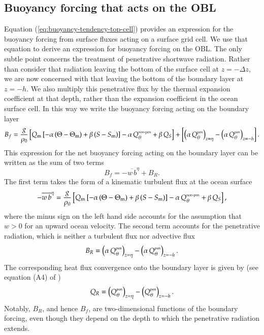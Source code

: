 \subsection{Buoyancy forcing that acts on the OBL}
\label{subsection:buoyancy-forcing-obl}

Equation (\ref{eq:buoyancy-tendency-top-cell}) provides an expression
for the buoyancy forcing from surface fluxes acting on a surface grid
cell.  We use that equation to derive an expression for buoyancy
forcing on the OBL.  The only subtle point concerns the treatment of
penetrative shortwave radiation.  Rather than consider that radiation
leaving the bottom of the surface cell at $z=-\Delta z$, we are now
concerned with that leaving the bottom of the boundary layer at
$z=-h$.  We also multiply this penetrative flux by the thermal
expansion coefficient at that depth, rather than the expansion
coefficient in the ocean surface cell.  In this way we write the
buoyancy forcing acting on the boundary layer
\begin{equation}
B_{f} =  \frac{g}{\rho_{0}} 
  \left[ 
 Q_{\mbox{\scriptsize m}} \, [ -\alpha \, (\Theta - \Theta_{\mbox{\scriptsize m}}) +  \beta \, (S - S_{\mbox{\scriptsize m}}) ]
  -\alpha \,  Q_{\theta}^{\mbox{\tiny non-pen}} + \beta \, Q_{S} 
  \right]
+ \left[ 
    \left( \alpha \, Q_{\theta}^{\mbox{\tiny pen}} \right)_{z=\eta}
 - \left( \alpha \, Q_{\theta}^{\mbox{\tiny pen}} \right)_{z=-h}
 \right].
\label{eq:buoyancy-forcing-obl}
\end{equation}
This expression for the net buoyancy forcing acting on the boundary
layer can be written as the sum of two terms
\begin{equation}
 B_{f} =  -\overline{w \, b}^{\eta}  + B_{R}. 
\label{eq:buoyancy-forcing-kpp}
\end{equation}
The first term takes the form of a kinematic turbulent flux at the
ocean surface
\begin{equation}
 -\overline{w \, b}^{\eta} =  
  \frac{g}{\rho_{0}} 
  \left[ 
 Q_{\mbox{\scriptsize m}} \, [ -\alpha \, (\Theta - \Theta_{\mbox{\scriptsize m}}) +  \beta \, (S - S_{\mbox{\scriptsize m}}) ]
  -\alpha \,  Q_{\theta}^{\mbox{\tiny non-pen}} + \beta \, Q_{S} 
 \right],
\label{eq:surface-turbulent-kinematic-flux}
\end{equation}
where the minus sign on the left hand side accounts for the assumption
that $w > 0$ for an upward ocean velocity.  The second term accounts
for the penetrative radiation, which is neither a turbulent flux nor
advective flux
\begin{equation}
 B_{R} = \left( \alpha \, Q_{\theta}^{\mbox{\tiny pen}} \right)_{z=\eta}
          -\left( \alpha \, Q_{\theta}^{\mbox{\tiny pen}} \right)_{z=-h}.
\label{eq:penetrative-buoyancy-kpp}
\end{equation}
The corresponding heat flux convergence onto the boundary layer is
given by (see equation (A4) of \cite{LargeKPP})
\begin{equation}
 Q_{R} = \left(Q_{\theta}^{\mbox{\tiny pen}} \right)_{z=\eta}
          -\left(Q_{\theta}^{\mbox{\tiny pen}} \right)_{z=-h}.
\label{eq:penetrative-heating-kpp}
\end{equation}
Notably, $B_{R}$, and hence $B_{f}$, are two-dimensional functions of
the boundary forcing, even though they depend on the depth to which
the penetrative radiation extends.


